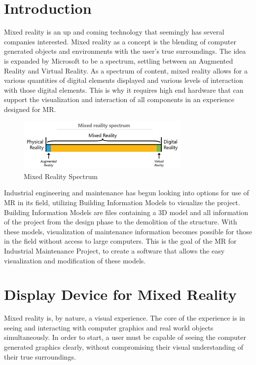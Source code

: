 \documentclass[10pt,draftclsnofoot,onecolumn,letterpaper]{IEEEtran}
\begin{document}
\section{Introduction}
Mixed reality is an up and coming technology that seemingly has several companies interested. Mixed reality as a concept is the blending of computer generated objects and environments with the user's true surroundings. The idea is expanded by Microsoft to be a spectrum, settling between an Augmented Reality and Virtual Reality\cite{MRWhat}.
As a spectrum of content, mixed reality allows for a various quantities of digital elements displayed and various levels of interaction with those digital elements. This is why it requires high end hardware that can support the visualization and interaction of all components in an experience designed for MR.\par
\begin{figure}[ht]
    \centering
    \includegraphics[width=0.75\textwidth]{mixed-reality-spectrum.png}
    \caption{Mixed Reality Spectrum\cite{MRWhat}}
    \label{fig:my_label}
\end{figure}
Industrial engineering and maintenance has begun looking into options for use of MR in its field, utilizing Building Information Models to visualize the project. Building Information Models are files containing a 3D model and all information of the project from the design phase to the demolition of the structure. With these models, visualization of maintenance information becomes possible for those in the field without access to large computers. This is the goal of the MR for Industrial Maintenance Project, to create a software that allows the easy visualization and modification of these models.\par

\section{Display Device for Mixed Reality}
Mixed reality is, by nature, a visual experience. The core of the experience is in seeing and interacting with computer graphics and real world objects simultaneously. In order to start, a user must be capable of seeing the computer generated graphics clearly, without compromising their visual understanding of their true surroundings.\par
\end{document}
